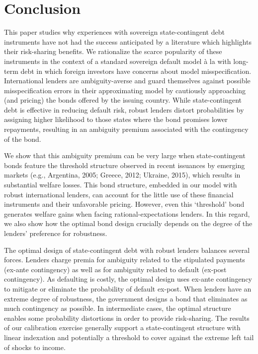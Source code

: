 \section{Conclusion}\label{sec:conc}

This paper studies why experiences with sovereign state-contingent debt instruments have not had the success anticipated by a literature which highlights their risk-sharing benefits. We rationalize the scarce popularity of these instruments in the context of a standard sovereign default model à la \cite{Eaton81} with long-term debt in which foreign investors have concerns about model misspecification. International lenders are ambiguity-averse and guard themselves against possible misspecification errors in their approximating model by cautiously approaching (and pricing) the bonds offered by the issuing country. While state-contingent debt is effective in reducing default risk, robust lenders distort probabilities by assigning higher likelihood to those states where the bond promises lower repayments, resulting in an ambiguity premium associated with the contingency of the bond.

We show that this ambiguity premium can be very large when state-contingent bonds feature the threshold structure observed in recent issuances by emerging markets (e.g., Argentina, 2005; Greece, 2012; Ukraine, 2015), which results in substantial welfare losses. This bond structure, embedded in our model with robust international lenders, can account for the little use of these financial instruments and their unfavorable pricing. However, even this `threshold' bond generates welfare gains when facing rational-expectations lenders. In this regard, we also show how the optimal bond design crucially depends on the degree of the lenders' preference for robustness.

The optimal design of state-contingent debt with robust lenders balances several forces. Lenders charge premia for ambiguity related to the stipulated payments (ex-ante contingency) as well as for ambiguity related to default (ex-post contingency). As defaulting is costly, the optimal design uses ex-ante contingency to mitigate or eliminate the probability of default ex-post. When lenders have an extreme degree of robustness, the government designs a bond that eliminates as much contingency as possible. In intermediate cases, the optimal structure enables some probability distortions in order to provide risk-sharing. The results of our calibration exercise generally support a state-contingent structure with linear indexation and potentially a threshold to cover against the extreme left tail of shocks to income.